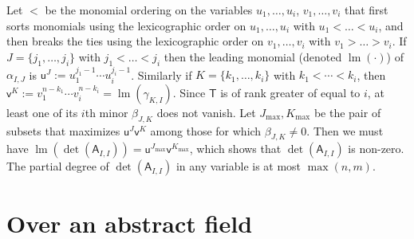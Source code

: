 \documentclass[sigconf]{acmart}
\newcommand{\vu}{\ensuremath{\mathsf{u}}}
\newcommand{\vv}{\ensuremath{\mathsf{v}}}
\newcommand{\mA}{\ensuremath{\mathsf{A}}}
\newcommand{\mT}{\ensuremath{\mathsf{T}}}
\newcommand{\lm}{\ensuremath{\operatorname{lm}}}
\newcommand{\todo}[1]{(\textbf{todo:} #1)}
\theoremstyle{acmdefinition}
\begin{document}
Let $<$ be the monomial ordering on the variables $u_1,\dots,u_i$,
$v_1,\dots,v_i$ that first sorts monomials using the lexicographic order on
$u_1,\dots,u_i$ with $u_1 < \dots < u_i$, and then breaks the ties using the
lexicographic order on $v_1,\dots,v_i$ with $v_1 > \dots > v_i$. If
$J=\{j_1,\dots,j_i\}$ with $j_1 < \dots < j_i$ then the leading monomial
(denoted $\lm(\cdot)$) of $\alpha_{I,J}$ is
$\vu^J := u_1^{j_1-1} \cdots u_i^{j_i-1}$.  Similarly if $K=\{k_1,\dots,k_i\}$
with $k_1 < \cdots < k_i$, then
$\vv^K := v_1^{n-k_1} \cdots v_i^{n-k_i}=\lm(\gamma_{K,I})$. Since $\mT$ is of
rank greater of equal to $i$, at least one of its $i$th minor $\beta_{J,K}$ does
not vanish. Let $J_{\max},K_{\max}$ be the pair of subsets that maximizes
$\vu^J \vv^K$ among those for which $\beta_{J,K} \neq 0$. Then we must have
$\lm(\det(\mA_{I,I})) = \vu^{J_{\max}} \vv^{K_{\max}}$, which shows that
$\det(\mA_{I,I})$ is non-zero. The partial degree of $\det(\mA_{I,I})$ in any variable
 is at most $\max(n,m)$. 



\vspace{-5px}
\section{Over an abstract field}\label{sec:abstract}
\end{document}

